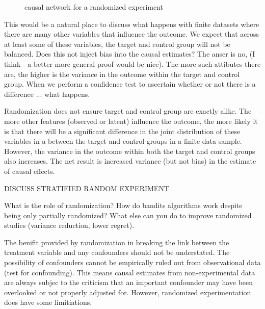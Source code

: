 \documentclass[11pt,a4paper,oneside]{book}
\begin{document}
\begin{figure}[h]
\caption{causal network for a randomized experiment}
\label{fig:random_experiment_network}
\centering
{}
\end{figure} 

This would be a natural place to discuss what happens with finite datasets where there are many other variables that influence the outcome. We expect that across at least some of these variables, the target and control group will not be balanced. Does this not inject bias into the causal estimates? The anser is no, (I think - a better more general proof would be nice). The more such attibutes there are, the higher is the variance in the outcome within the target and control group. When we perform a confidence test to ascertain whether or not there is a difference ... what happens.

Randomization does not ensure target and control group are exactly alike. The more other features (observed or latent) influence the outcome, the more likely it is that there will be a significant difference in the joint distribution of these variables in a between the target and control groups in a finite data sample. However, the variance in the outcome within both the target and control groups also increases. The net result is increased variance (but not bias) in  the estimate of causal effects. 

DISCUSS STRATIFIED RANDOM EXPERIMENT

What is the role of randomization? How do bandits algorithms work despite being only partially randomized? What else can you do to improve randomized studies (variance reduction, lower regret).

The benifit provided by randomization in breaking the link between the treatment variable and any confounders should not be understated. The possibility of confounders cannot be empirically ruled out from observational data \citep{Pearl2000} (test for confounding). This means causal estimates from non-experimental data are always subjec to the criticism that an important confounder may have been overlooked or not properly adjusted for. However, randomized experimentation does have some limitiations. 
\end{document}
